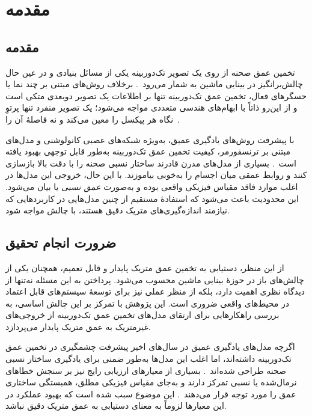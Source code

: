 \chapter{مقدمه}
\section{مقدمه}
تخمین عمق صحنه از روی یک تصویر تک‌دوربینه یکی از مسائل بنیادی و در عین حال چالش‌برانگیز در بینایی ماشین به شمار می‌رود~\cite{Saxena2009Make3D,Eigen2014Depth}.
برخلاف روش‌های مبتنی بر چند نما یا حسگرهای فعال،
تخمین عمق تک‌دوربینه تنها بر اطلاعات یک تصویر دوبعدی متکی است و از این‌رو ذاتاً با ابهام‌های هندسی متعددی مواجه می‌شود؛ یک تصویر منفرد تنها پرتوِ نگاه هر پیکسل را معین می‌کند و نه فاصلهٔ آن را~\cite{HartleyZisserman2004,Eigen2014Depth}.

با پیشرفت روش‌های یادگیری عمیق، به‌ویژه شبکه‌های عصبی کانولوشنی و مدل‌های مبتنی بر ترنسفورمر،
کیفیت تخمین عمق تک‌دوربینه به‌طور قابل توجهی بهبود یافته است~\cite{Eigen2015Predicting,Ranftl2021DPT}.
بسیاری از مدل‌های مدرن قادرند ساختار نسبی صحنه را با دقت بالا بازسازی کنند و روابط عمقی میان اجسام را به‌خوبی بیاموزند. با این حال، خروجی این مدل‌ها در اغلب موارد فاقد مقیاس فیزیکی واقعی بوده و به‌صورت \emph{عمق نسبی} یا \emph{} بیان می‌شود. این محدودیت باعث می‌شود که استفادهٔ مستقیم از چنین مدل‌هایی در کاربردهایی که نیازمند اندازه‌گیری‌های متریک دقیق هستند، با چالش مواجه شود.

\section{ضرورت انجام تحقیق}
از این منظر، دستیابی به تخمین عمق متریک پایدار و قابل تعمیم، همچنان یکی از چالش‌های باز در حوزهٔ بینایی ماشین محسوب می‌شود. پرداختن به این مسئله نه‌تنها از دیدگاه نظری اهمیت دارد، بلکه از منظر عملی نیز برای توسعهٔ سیستم‌های قابل اعتماد در محیط‌های واقعی ضروری است. این پژوهش با تمرکز بر این چالش اساسی، به بررسی راهکارهایی برای ارتقای مدل‌های تخمین عمق تک‌دوربینه از خروجی‌های غیرمتریک به عمق متریک پایدار می‌پردازد.


اگرچه مدل‌های یادگیری عمیق در سال‌های اخیر پیشرفت چشمگیری در تخمین عمق تک‌دوربینه داشته‌اند،
اما اغلب این مدل‌ها به‌طور ضمنی برای یادگیری ساختار نسبی صحنه طراحی شده‌اند~\cite{Eigen2014Depth,Ranftl2019Robust}. بسیاری از معیارهای ارزیابی رایج نیز بر سنجش خطاهای نرمال‌شده یا نسبی تمرکز دارند
و به‌جای مقیاس فیزیکی مطلق، همبستگی ساختاری عمق را مورد توجه قرار می‌دهند~\cite{Ranftl2019Robust,Ranftl2021DPT}. این موضوع سبب شده است که بهبود عملکرد در این معیارها لزوماً به معنای دستیابی به عمق متریک دقیق نباشد.

